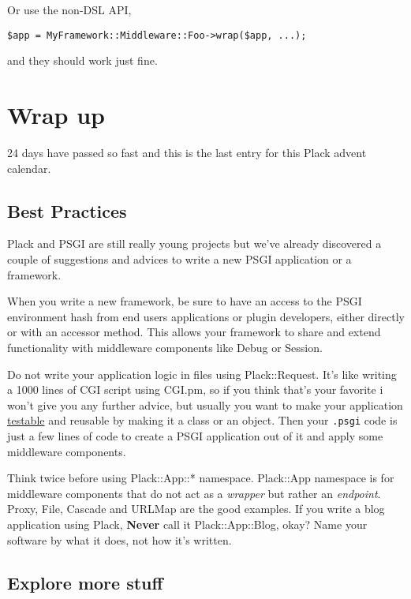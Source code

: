 Or use the non-DSL API,

\begin{lstlisting}
$app = MyFramework::Middleware::Foo->wrap($app, ...);
\end{lstlisting}

and they should work just fine.

\chapter{Wrap up}\label{day-24-wrap-up}

24 days have passed so fast and this is the last entry for this Plack
advent calendar.

\section{Best Practices}\label{best-practices}

Plack and PSGI are still really young projects but we've already
discovered a couple of suggestions and advices to write a new PSGI
application or a framework.

When you write a new framework, be sure to have an access to the PSGI
environment hash from end users applications or plugin developers,
either directly or with an accessor method. This allows your framework
to share and extend functionality with middleware components like Debug
or Session.

Do not write your application logic in  files using
Plack::Request. It's like writing a 1000 lines of CGI script using
CGI.pm, so if you think that's your favorite i won't give you any
further advice, but usually you want to make your application
\href{http://advent.plackperl.org/2009/12/day-13-use-placktest-to-test-your-application.html}{testable}
and reusable by making it a class or an object. Then your
\lstinline!.psgi! code is just a few lines of code to create a PSGI
application out of it and apply some middleware components.

Think twice before using Plack::App::* namespace. Plack::App namespace
is for middleware components that do not act as a \emph{wrapper} but
rather an \emph{endpoint}. Proxy, File, Cascade and URLMap are the good
examples. If you write a blog application using Plack, \textbf{Never}
call it Plack::App::Blog, okay? Name your software by what it does, not
how it's written.

\section{Explore more stuff}\label{explore-more-stuff}

